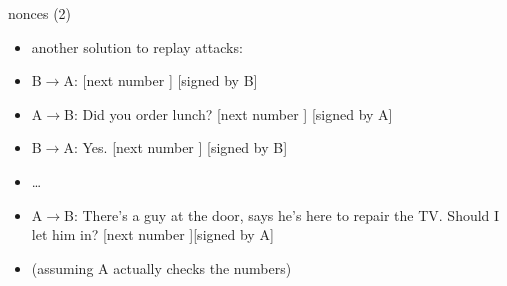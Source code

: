 \begin{frame}{nonces (2)}
    \begin{itemize}
    \item another solution to replay attacks:
    \item B$\rightarrow$A: [next number ] [signed by B]
    \item A$\rightarrow$B:  Did you order lunch? [next number ] [signed by A]
    \item B$\rightarrow$A:  Yes. [next number ] [signed by B]
    \item \ldots
    \item A$\rightarrow$B:  There's a guy at the door, says he's here to repair the TV. Should I let him in? [next number ][signed by A]
    \vspace{.5cm}
    \item (assuming A actually checks the numbers)
    \end{itemize}
\end{frame}
